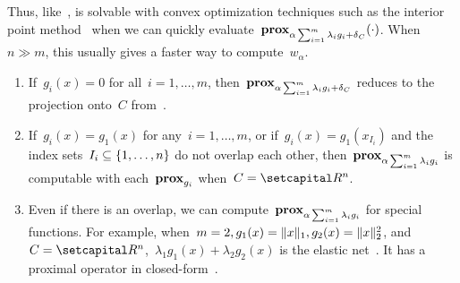 \documentclass[../../main]{subfiles}
\begin{document}
                           Thus, like~,  is solvable with convex optimization techniques such as the interior point method~\cite{Bertsekas1999} when we can quickly evaluate~$\prox_{\alpha \sum_{i = 1}^{m} \lambda_i g_i + \indicator_C}(\cdot)$.
                           When~$n \gg m$, this usually gives a faster way to compute~$w_\alpha$.
                           \begin{example}
                               \begin{enumerate}
                                   \item If~$g_i(x) = 0$ for all~$i = 1, \dots, m$, then~$\prox_{\alpha \sum_{i = 1}^{m} \lambda_i g_i + \indicator_C}$ reduces to the projection onto~$C$ from~.
                                   \item If~$g_i(x) = g_1(x)$ for any~$i = 1, \dots, m$, or if~$g_i(x) = g_1(x_{I_i})$ and the index sets~$I_i \subseteq \set*{1, \dots, n}$ do not overlap each other, then~$\prox_{\alpha \sum_{i = 1}^{m} \lambda_i g_i}$ is computable with each~$\prox_{g_i}$ when~$C = \setR^n$.
                                   \item Even if there is an overlap, we can compute~$\prox_{\alpha \sum_{i = 1}^{m} \lambda_i g_i}$ for special functions.
                                       For example, when~$m = 2, g_1(x) = \norm{x}_1, g_2(x) = \norm{x}_2^2$, and~$C = \setR^n$,~$\lambda_1 g_1(x) + \lambda_2 g_2(x)$ is the elastic net~\cite{Zou2005}. 
                                       It has a proximal operator in closed-form~\cite[Section 6.5.3]{Parikh2014}.
                               \end{enumerate}
                           \end{example}
\end{document}

